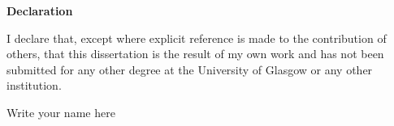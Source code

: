 \noindent
{\LARGE\textbf{Declaration}}
\vspace{1cm}

\begin{spacing}{1.5} 
\noindent
I declare that, except where explicit reference is made to the contribution of others, that this dissertation is the result of my own work and has not been submitted for any other degree at the University of Glasgow or any other institution.





\vspace{3cm}
\begin{flushright}
Write your name here
\end{flushright}
\end{spacing}
